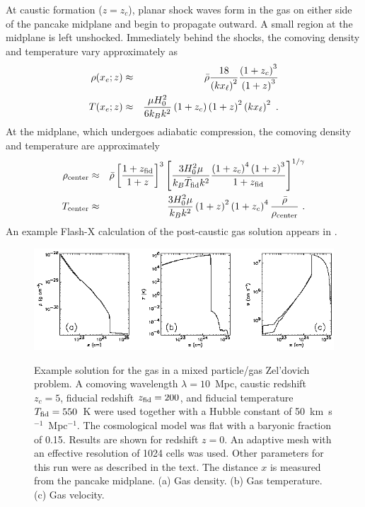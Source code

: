 At caustic formation ($z=z_c$), planar shock waves form in the gas
on either side
of the pancake midplane and begin to propagate outward. A small region
at the midplane is left unshocked. Immediately behind the shocks, the
comoving density and temperature vary approximately as
\begin{eqnarray}
\rho(x_e;z) &\approx&
        \bar{\rho}{18\over\left(kx_\ell\right)^2}
        {\left(1+z_c\right)^3\over\left(1+z\right)^3}\\
\nonumber
T(x_e;z) &\approx&
        {\mu H_0^2\over6k_Bk^2}\left(1+z_c\right)
        \left(1+z\right)^2\left(kx_\ell\right)^2\ .
\end{eqnarray}
\noindent At the midplane, which undergoes adiabatic compression, the
comoving density and temperature are approximately
\begin{eqnarray}
\rho_{\rm center} &\approx&
        \bar{\rho}\left[{1+z_{\rm fid}\over 1+z}\right]^3
        \left[{3H_0^2\mu\over k_B\bar{T}_{\rm fid}k^2}
        {\left(1+z_c\right)^4\left(1+z\right)^3\over
        1+z_{\rm fid}}\right]^{1/\gamma}\\
\nonumber
T_{\rm center} &\approx&
        {3H_0^2\mu\over k_Bk^2} \left(1+z\right)^2
        \left(1+z_c\right)^4{\bar{\rho}\over\rho_{\rm center}}\ .
\end{eqnarray}
An example Flash-X calculation of the post-caustic gas solution
appears in .

\begin{figure}[!t]
\begin{center}
{\leavevmode\includegraphics[width=5.5in]{Pancake_gas}}
\end{center}
\caption{\label{Fig:gas pancake}
Example solution for the gas in a mixed particle/gas Zel'dovich
 problem.
A comoving wavelength $\lambda = 10$~Mpc, caustic redshift $z_c = 5$,
fiducial redshift $z_{\rm fid} = 200$, and fiducial temperature
$T_{\rm fid} = 550$~K were used together with
a Hubble constant of 50~km~s$^{-1}$~Mpc$^{-1}$.
The cosmological model was flat with a baryonic fraction of 0.15.
Results are shown for redshift $z=0$. An adaptive mesh with an
effective resolution of 1024 cells was used. Other parameters for this
run were as described in the text. The distance $x$ is measured from the
pancake midplane.
(a) Gas density. (b) Gas temperature. (c) Gas velocity.
}
\end{figure}

